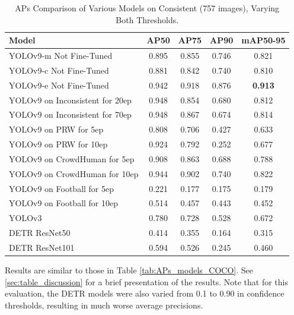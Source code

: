 \begin{table}[H]
    \centering
    \renewcommand{\arraystretch}{1.5}
    \setlength{\tabcolsep}{1em}
    \begin{tabular}{|l|c|c|c|c|}
        \hline
        \rowcolor{gray!25}
        \textbf{Model} & \textbf{AP50} & \textbf{AP75} & \textbf{AP90} & \textbf{mAP50-95} \\ \hline
        YOLOv9-m Not Fine-Tuned          & 0.895 & 0.855 & 0.746 & 0.821 \\ \hline
        YOLOv9-c Not Fine-Tuned          & 0.881 & 0.842 & 0.740 & 0.810 \\ \hline
        YOLOv9-e Not Fine-Tuned          & 0.942 & 0.918 & 0.876 & \textbf{0.913} \\ \hline
        YOLOv9 on Inconsistent for 20ep  & 0.948 & 0.854 & 0.680 & 0.812 \\ \hline
        YOLOv9 on Inconsistent for 70ep  & 0.948 & 0.867 & 0.674 & 0.814 \\ \hline
        YOLOv9 on PRW for 5ep            & 0.808 & 0.706 & 0.427 & 0.633 \\ \hline
        YOLOv9 on PRW for 10ep           & 0.924 & 0.792 & 0.252 & 0.677 \\ \hline
        YOLOv9 on CrowdHuman for 5ep     & 0.908 & 0.863 & 0.688 & 0.788 \\ \hline
        YOLOv9 on CrowdHuman for 10ep    & 0.944 & 0.902 & 0.740 & 0.822 \\ \hline
        YOLOv9 on Football for 5ep       & 0.221 & 0.177 & 0.175 & 0.179 \\ \hline
        YOLOv9 on Football for 10ep      & 0.514 & 0.457 & 0.443 & 0.452 \\ \hline
        YOLOv3                           & 0.780 & 0.728 & 0.528 & 0.672 \\ \hline
        DETR ResNet50                    & 0.414 & 0.355 & 0.164 & 0.315 \\ \hline
        DETR ResNet101                   & 0.594 & 0.526 & 0.245 & 0.460 \\ \hline
    \end{tabular}
    \caption{APs Comparison of Various Models on Consistent (757 images), Varying Both Thresholds.}
    \label{tab:APs_models_both}
\end{table}

Results are similar to those in Table \ref{tab:APs_models_COCO}. See \ref{sec:table_discussion} for a brief presentation of the results. Note that for this evaluation, the DETR models were also varied from 0.1 to 0.90 in confidence thresholds, resulting in much worse average precisions.

